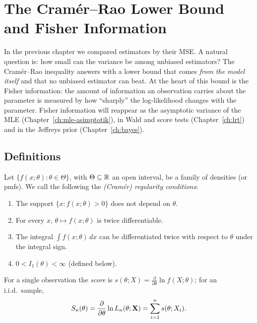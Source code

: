 \documentclass[main.tex]{subfiles}
\begin{document}
\chapter{The Cramér--Rao Lower Bound and Fisher Information}\label{ch:cramer-rao}

In the previous chapter we compared estimators by their MSE. A natural question is: how small can the variance be among unbiased estimators? The Cramér--Rao inequality answers with a lower bound that comes \emph{from the model itself} and that no unbiased estimator can beat. At the heart of this bound is the Fisher information: the amount of information an observation carries about the parameter is measured by how ``sharply'' the log-likelihood changes with the parameter. Fisher information will reappear as the asymptotic variance of the MLE (Chapter~\ref{ch:mle-asimptotik}), in Wald and score tests (Chapter~\ref{ch:lrt}) and in the Jeffreys prior (Chapter~\ref{ch:bayes}).

\section{Definitions}

\begin{definition}\label{def:duzenlilik}
Let $\{f(x;\theta):\theta\in\Theta\}$, with $\Theta\subseteq\mathbb{R}$ an open interval, be a family of densities (or pmfs). We call the following the \emph{(Cramér) regularity conditions}:
\begin{enumerate}[label=(R\arabic*)]
  \item The support $\{x: f(x;\theta)>0\}$ does not depend on $\theta$.
  \item For every $x$, $\theta\mapsto f(x;\theta)$ is twice differentiable.
  \item The integral $\int f(x;\theta)\,dx$ can be differentiated twice with respect to $\theta$ under the integral sign.
  \item $0<I_1(\theta)<\infty$ (defined below).
\end{enumerate}
\end{definition}

\begin{definition}
For a single observation the \emph{score} is $s(\theta;X)=\frac{\partial}{\partial\theta}\ln f(X;\theta)$; for an i.i.d.\ sample,
\[
S_n(\theta)=\frac{\partial}{\partial\theta}\ln L_n(\theta;\mathbf{X})=\sum_{i=1}^n s(\theta;X_i).
\]
\end{definition}
\end{document}
